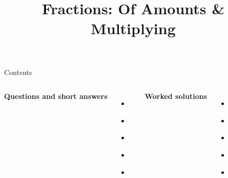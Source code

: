 \documentclass{beamer}
\title{Fractions: Of Amounts \& Multiplying}
\author{}
\date{}
\begin{document}
\frame{\titlepage}

\begin{frame}{Contents}
\small
\begin{columns}[T]

\textbf{Questions and short answers}
\begin{itemize}
  \item \hyperlink{q-st1}{}
  \item \hyperlink{q-st2}{}
  \item \hyperlink{q-st3}{}
  \item \hyperlink{q-st4}{}
  \item \hyperlink{q-st5}{}
\end{itemize}

\textbf{Worked solutions}
\begin{itemize}
  \item \hyperlink{work-st1}{}
  \item \hyperlink{work-st2}{}
  \item \hyperlink{work-st3}{}
  \item \hyperlink{work-st4}{}
  \item \hyperlink{work-st5}{}
\end{itemize}

\end{columns}
\end{frame}
\end{document}
